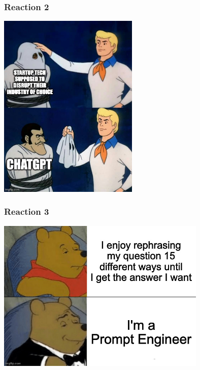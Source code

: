 \begin{frame}
\frametitle{Reaction 2}

\begin{center}
	\includegraphics[width=0.5\textwidth]{images/startup.jpg}
\end{center}

\end{frame}

\begin{frame}
\frametitle{Reaction 3}

\begin{center}
	\includegraphics[width=0.75\textwidth]{images/prompt.jpg}
\end{center}

\end{frame}

